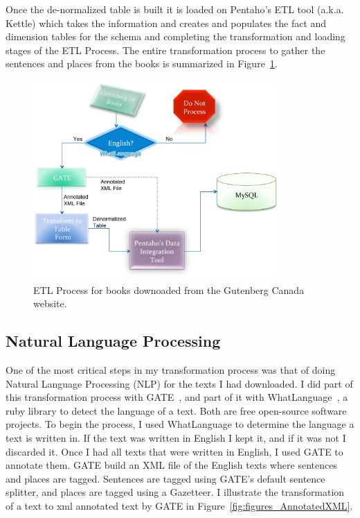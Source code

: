 Once the de-normalized table is built it is loaded on Pentaho's ETL tool (a.k.a. Kettle) which takes the information and creates and populates the fact and
dimension tables for the schema and completing the transformation and loading stages of the ETL Process. The entire transformation process to gather the
sentences and places from the books is summarized in Figure~\ref{fig:figures_BookETLProcess}.

\begin{figure}[htbp]
    \centering
        \includegraphics[height=3in]{figures/BookETLProcess.pdf}
    \caption{ETL Process for books downoaded from the Gutenberg Canada website.}
    \label{fig:figures_BookETLProcess}
\end{figure}

\subsection{Natural Language Processing} %
\label{sub:natural_language_processing}

One of the most critical steps in my transformation process was that of doing Natural Language Processing (NLP) for the texts I had downloaded. I did part of
this transformation process with GATE~\cite{gate-url}, and part of it with WhatLanguage~\cite{whatlanguage-url}, a ruby library to detect the language of a
text. Both are free open-source software projects. To begin the process, I used WhatLanguage to determine the language a text is written in. If the text was
written in English I kept it, and if it was not I discarded it. Once I had all texts that were written in English, I used GATE to annotate them. GATE build an
XML file of the English texts where sentences and places are tagged. Sentences are tagged using GATE’s default sentence splitter, and places are tagged using a
Gazetteer. I illustrate the transformation of a text to xml annotated text by GATE in Figure~\ref{fig:figures_AnnotatedXML}.

